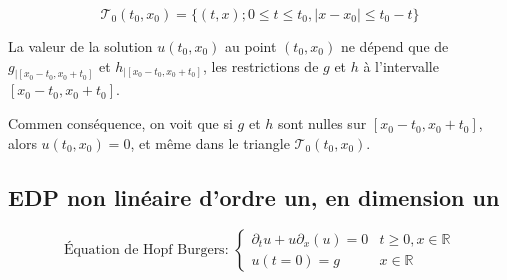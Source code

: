\documentclass[10pt,a4paper,oneside]{article}
\begin{document}
\begin{itemize}
\[ \mathcal{T}_0 (t_0,x_0) = \{(t,x); 0 \leq t \leq t_0, |x - x_0| \leq t_0 - t\} \]

La valeur de la solution $u(t_0,x_0)$ au point $(t_0,x_0)$ ne dépend que de $g_{|[x_0-t_0,x_0+t_0]}$ et $h_{|[x_0-t_0,x_0+t_0]}$, les restrictions de $g$ et $h$ à l'intervalle $[x_0-t_0,x_0+t_0]$.

Commen conséquence, on voit que si $g$ et $h$ sont nulles sur $[x_0-t_0,x_0+t_0]$, alors $u(t_0,x_0) = 0$, et même dans le triangle $\mathcal{T}_0 (t_0,x_0)$.

\end{itemize}

\subsection{EDP non linéaire d'ordre un, en dimension un}

\[ \text{Équation de Hopf Burgers: } \begin{cases}
\partial_t u +u \partial_x (u) = 0 & t \geq 0, x \in \mathbb{R} \\
u(t = 0) = g & x \in \mathbb{R}
\end{cases} \]
\end{document}

